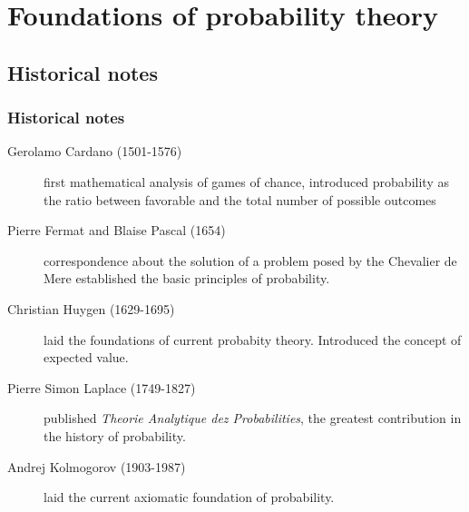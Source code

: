 \section{Foundations of probability theory}

\subsection{Historical notes}

\begin{frame}
\frametitle{Historical notes}

\small
\begin{description}

    \item[Gerolamo Cardano (1501-1576)] first mathematical analysis of games of chance, introduced probability as the ratio between favorable and the total number of possible outcomes

    \item[Pierre Fermat and Blaise Pascal (1654)] correspondence about the solution of a problem posed by the Chevalier de Mere established the basic principles of probability.

    \item[Christian Huygen (1629-1695)] laid the foundations of current probabity theory. Introduced the concept of expected value.

    \item[Pierre Simon Laplace (1749-1827)] published \textit{Theorie Analytique dez Probabilities}, the greatest contribution in the history of probability.

    \item[Andrej Kolmogorov (1903-1987)] laid the current axiomatic foundation of probability.

\end{description}
\normalsize

\end{frame}


